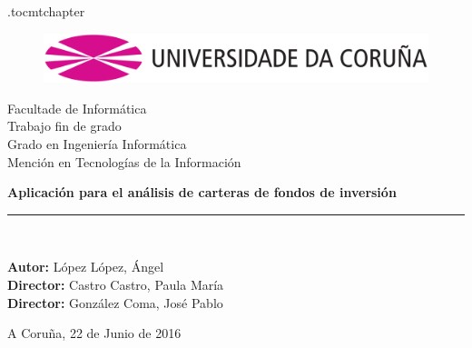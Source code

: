 \documentclass[12pt, a4paper]{book}
\newcommand*\parttitle{}
\let\origpart\part
\renewcommand*{\part}[2][]{%
	\ifx\\#1\\%
	\origpart{#2}%
	\renewcommand*\parttitle{#2}%
	\else
	\origpart[#1]{#2}%
	\renewcommand*\parttitle{#1}%
	\fi
}
\begin{document}
\etocdepthtag.toc{mtchapter}
\renewcommand{\partname}{Capítulo}
\renewcommand{\tablename}{Tabla}
\renewcommand{\acronymname }{Acrónimos}
\let\Oldpart\part


\begin{titlepage}

\begin{center}
\vspace*{-0.2in}
\begin{figure}[htb]
\begin{center}
\includegraphics[width=12cm]{figuras/logo.png}
\end{center}
\end{figure}
\vspace*{0.6in}
{\Large Facultade de Informática}\\[1.25cm]
\vspace*{0.15in}
{\LARGE Trabajo fin de grado}\\[0.75cm]
{\LARGE  Grado en Ingeniería Informática}\\[0.5cm]
{Mención en Tecnologías de la Información }\\[1.25cm]
\vspace*{0.6in}
\vspace*{0.2in}
\begin{Large}
\textbf{Aplicación para el análisis de carteras de fondos de inversión} \\
\end{Large}
\vspace*{2in}
\vspace*{0.3in}
\rule{80mm}{0.1mm}\\
\vspace*{0.1in}
\begin{large}
\textbf{Autor:} López López, Ángel\\
\textbf{Director:} Castro Castro, Paula María\\
\textbf{Director:} González Coma, José Pablo \\
\end{large}
\vspace*{0.3in}
A Coruña, 22 de Junio de 2016
\end{center}

\end{titlepage}
\end{document}
